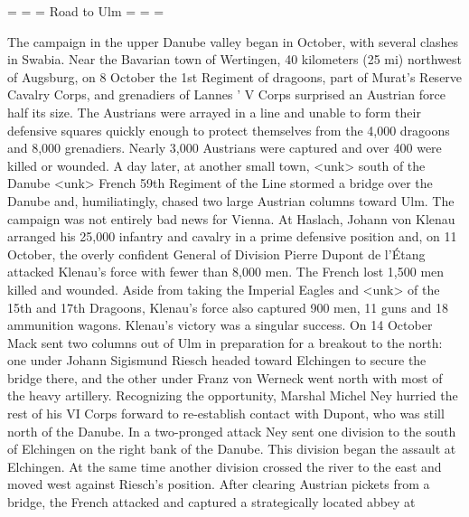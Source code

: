 = = = Road to Ulm = = = 

The campaign in the upper Danube valley began in October, with several clashes in Swabia. Near the Bavarian town of Wertingen, 40 kilometers (25 mi) northwest of Augsburg, on 8 October the 1st Regiment of dragoons, part of Murat's Reserve Cavalry Corps, and grenadiers of Lannes ' V Corps surprised an Austrian force half its size. The Austrians were arrayed in a line and unable to form their defensive squares quickly enough to protect themselves from the 4,000 dragoons and 8,000 grenadiers. Nearly 3,000 Austrians were captured and over 400 were killed or wounded. A day later, at another small town, <unk> south of the Danube <unk> French 59th Regiment of the Line stormed a bridge over the Danube and, humiliatingly, chased two large Austrian columns toward Ulm. 
The campaign was not entirely bad news for Vienna. At Haslach, Johann von Klenau arranged his 25,000 infantry and cavalry in a prime defensive position and, on 11 October, the overly confident General of Division Pierre Dupont de l'\'{E}tang attacked Klenau's force with fewer than 8,000 men. The French lost 1,500 men killed and wounded. Aside from taking the Imperial Eagles and <unk> of the 15th and 17th Dragoons, Klenau's force also captured 900 men, 11 guns and 18 ammunition wagons. 
Klenau's victory was a singular success. On 14 October Mack sent two columns out of Ulm in preparation for a breakout to the north: one under Johann Sigismund Riesch headed toward Elchingen to secure the bridge there, and the other under Franz von Werneck went north with most of the heavy artillery. Recognizing the opportunity, Marshal Michel Ney hurried the rest of his VI Corps forward to re-establish contact with Dupont, who was still north of the Danube. In a two-pronged attack Ney sent one division to the south of Elchingen on the right bank of the Danube. This division began the assault at Elchingen. At the same time another division crossed the river to the east and moved west against Riesch's position. After clearing Austrian pickets from a bridge, the French attacked and captured a strategically located abbey at %
